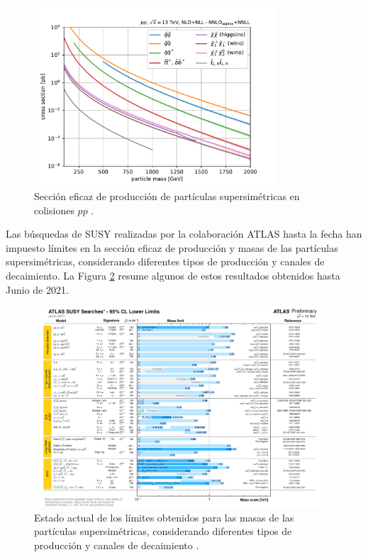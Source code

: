 \begin{figure}
  \centering
  \includegraphics[width=0.8\textwidth]{images/theory/SUSY_xsecs_13TeV_overview.pdf}
  \caption{Sección eficaz de producción de partículas supersimétricas en colisiones $pp$ \cite{susy_xs_web}.}
  \label{fig:susy_xs}
\end{figure}


Las búsquedas de SUSY realizadas por la colaboración ATLAS hasta la fecha han impuesto límites en la sección eficaz de producción y masas de las partículas supersimétricas, considerando diferentes tipos de producción y canales de decaimiento. La Figura \ref{fig:susy_xs_limits} resume algunos de estos resultados obtenidos hasta Junio de 2021.


\begin{figure}
	\centering
  \includegraphics[width=0.95\textwidth]{images/theory/susy_xs_limits.pdf}
  \caption{Estado actual de los límites obtenidos para las masas de las partículas supersimétricas, considerando diferentes tipos de producción y canales de decaimiento \cite{susy_xs_limits}.}
  \label{fig:susy_xs_limits}
\end{figure}